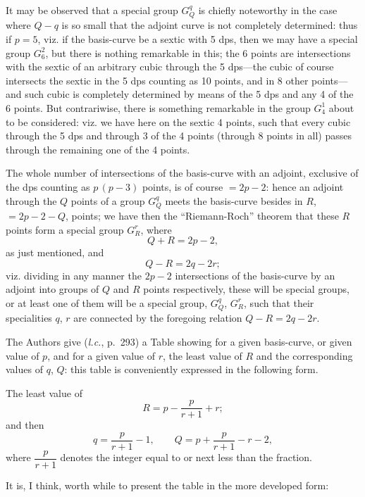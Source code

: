 \documentclass[11pt,a4paper]{article}
\theoremstyle{plain}
\theoremstyle{definition}
\theoremstyle{remark}
\begin{document}
It may be observed that a special group $G_Q^q$ is chiefly noteworthy in the case where $Q-q$ is so small that the adjoint curve is not completely determined: thus if $p = 5$, viz. if the basis-curve be a sextic with 5 dps, then we may have a special group $G_6^2$, but there is nothing remarkable in this; the 6 points are intersections with the sextic of an arbitrary cubic through the 5 dps---the cubic of course intersects the sextic in the 5 dps counting as 10 points, and in 8 other points---and such cubic is completely determined by means of the 5 dps and any 4 of the 6 points. But contrariwise, there is something remarkable in the group $G_4^1$ about to be considered: viz. we have here on the sextic 4 points, such that every cubic through the 5 dps and through 3 of the 4 points (through 8 points in all) passes through the remaining one of the 4 points.

The whole number of intersections of the basis-curve with an adjoint, exclusive of the dps counting as $p\,(p-3)$ points, is of course $= 2p-2$: hence an adjoint through the $Q$ points of a group $G_Q^q$ meets the basis-curve besides in $R$, $= 2p-2-Q$, points; we have then the ``Riemann-Roch'' theorem that these $R$ points form a special group $G_R^r$, where
\[
Q + R = 2p - 2,
\]
as just mentioned, and
\[
Q - R = 2q - 2r;
\]
viz. dividing in any manner the $2p-2$ intersections of the basis-curve by an adjoint into groups of $Q$ and $R$ points respectively, these will be special groups, or at least one of them will be a special group, $G_Q^q$, $G_R^r$, such that their specialities $q$, $r$ are connected by the foregoing relation $Q - R = 2q - 2r$.

The Authors give (\textit{l.c.}, p.~293) a Table showing for a given basis-curve, or given value of $p$, and for a given value of $r$, the least value of $R$ and the corresponding values of $q$, $Q$: this table is conveniently expressed in the following form.

The least value of
\[
R = p - \frac{p}{r+1} + r;
\]
and then
\[
q = \frac{p}{r+1} - 1,\qquad Q = p + \frac{p}{r+1} - r - 2,
\]
where $\dfrac{p}{r+1}$ denotes the integer equal to or next less than the fraction.

It is, I think, worth while to present the table in the more developed form:
\end{document}
